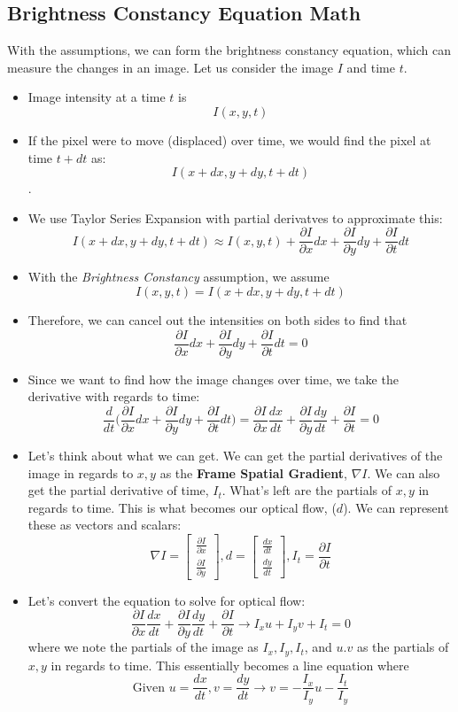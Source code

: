 \documentclass{article}
\begin{document}
\subsection{Brightness Constancy Equation Math}
With the assumptions, we can form the brightness constancy equation, which can measure the changes in an image. Let us consider the image $I$ and time $t$.
\begin{itemize}
    \item Image intensity at a time $t$ is 
    $$I(x,y,t)$$
    \item If the pixel were to move (displaced) over time, we would find the pixel at time $t + dt$ as:
    $$I(x +dx,y+dy,t+dt)$$.
    \item We use Taylor Series Expansion with partial derivatves to approximate this:
    $$I(x +dx,y+dy,t+dt) \approx I(x,y,t) + \frac{\partial I}{\partial x}dx + \frac{\partial I}{\partial y}dy + \frac{\partial I}{\partial t}dt$$
    \item With the \textit{Brightness Constancy} assumption, we assume 
    $$I(x,y,t) = I(x +dx,y+dy,t+dt)$$
    \item Therefore, we can cancel out the intensities on both sides to find that 
    $$\frac{\partial I}{\partial x}dx + \frac{\partial I}{\partial y}dy + \frac{\partial I}{\partial t}dt = 0$$
    \item Since we want to find how the image changes over time, we take the derivative with regards to time:
    $$\frac{d}{dt}\Bigg(\frac{\partial I}{\partial x}dx + \frac{\partial I}{\partial y}dy + \frac{\partial I}{\partial t}dt\Bigg) = 
    \frac{\partial I}{\partial x}\frac{dx}{dt} + \frac{\partial I}{\partial y}\frac{dy}{dt} + \frac{\partial I}{\partial t}=0$$
    \item Let's think about what we can get. We can get the partial derivatives of the image in regards to $x,y$ as the \textbf{Frame Spatial Gradient}, $\nabla I$. We can also get the partial derivative of time, $I_t$. What's left are the partials of $x,y$ in regards to time. This is what becomes our optical flow, ($d$). We can represent these as vectors and scalars:
    $$\nabla I  = \begin{bmatrix}
    \frac{\partial I}{\partial x} \\ \frac{\partial I}{\partial y}
    \end{bmatrix}, d = \begin{bmatrix}
    \frac{dx}{dt} \\ \frac{dy}{dt}
    \end{bmatrix}, I_t = \frac{\partial I}{\partial t}$$
    \item Let's convert the equation to solve for optical flow:
    $$\frac{\partial I}{\partial x}\frac{dx}{dt} + \frac{\partial I}{\partial y}\frac{dy}{dt} + \frac{\partial I}{\partial t} \rightarrow I_xu+I_yv+I_t = 0$$
    where we note the partials of the image as $I_x,I_y,I_t$, and $u.v$ as the partials of $x,y$ in regards to time. This essentially becomes a line equation where 
    $$\text{Given } u = \frac{dx}{dt}, v =\frac{dy}{dt}  \rightarrow  v = -\frac{I_x}{I_y}u - \frac{I_t}{I_y}$$
\end{itemize}
\end{document}

